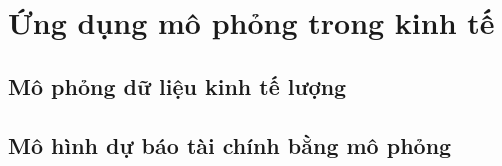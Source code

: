 \chapter{Ứng dụng mô phỏng trong kinh tế}
\section{Mô phỏng dữ liệu kinh tế lượng}
\section{Mô hình dự báo tài chính bằng mô phỏng}